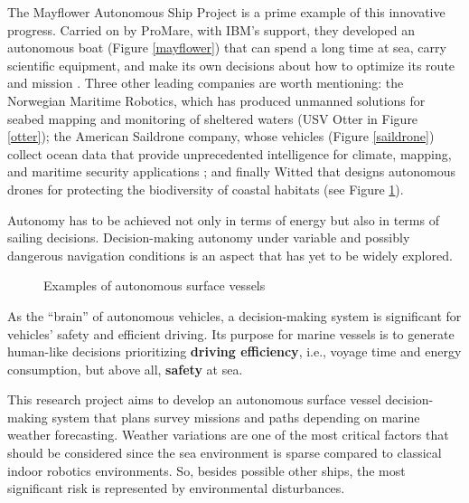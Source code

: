 The Mayflower Autonomous Ship Project is a prime example of this innovative progress. Carried on by ProMare, with IBM's support, they developed an autonomous boat (Figure \ref{mayflower}) that can spend a long time at sea, carry scientific equipment, and make its own decisions about how to optimize its route and mission \cite{Mayflower}. 
Three other leading companies are worth mentioning: the Norwegian Maritime Robotics, which has produced unmanned solutions for seabed mapping and monitoring of sheltered waters \cite{MaritimeRobotics} (USV Otter in Figure \ref{otter}); the American Saildrone company, whose vehicles (Figure \ref{saildrone}) collect ocean data that provide unprecedented intelligence for climate, mapping, and maritime security applications \cite{Saildrone}; and finally Witted \cite{witted} that designs autonomous drones for protecting the biodiversity of coastal habitats (see Figure \ref{wittsail}).

Autonomy has to be achieved not only in terms of energy but also in terms of sailing decisions. Decision-making autonomy under variable and possibly dangerous navigation conditions is an aspect that has yet to be widely explored.
\vspace{0.5cm}
\begin{figure}[H]
	\centering
	\hspace{0.2cm}
	\centering
	\hspace{0.2cm}
	\hspace{0.2cm}
	\caption{Examples of autonomous surface vessels}
	\label{wittsail}
\end{figure}
As the ``brain'' of autonomous vehicles, a decision-making system is significant for vehicles' safety and efficient driving. Its purpose for marine vessels is to generate human-like decisions prioritizing \textbf{driving efficiency}, i.e., voyage time and energy consumption, but above all, \textbf{safety} at sea. 

This research project aims to develop an autonomous surface vessel decision-making system that plans survey missions and paths depending on marine weather forecasting.
Weather variations are one of the most critical factors that should be considered since the sea environment is sparse compared to classical indoor robotics environments. So, besides possible other ships, the most significant risk is represented by environmental disturbances.

